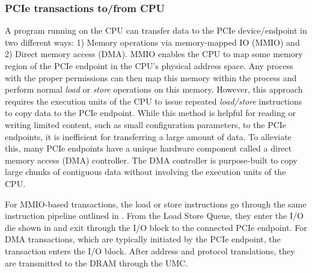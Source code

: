 \subsubsection{PCIe transactions to/from CPU}
\label{subsubsec:interconnect-sc-background-cpu-arch-pcie-transactions}

A program running on the CPU can transfer data to the PCIe device/endpoint in two different ways: 1) Memory operations via memory-mapped IO (MMIO) and 2) Direct memory access (DMA).
MMIO enables the CPU to map some memory region of the PCIe endpoint in the CPU's physical address space.
Any process with the proper permissions can then map this memory within the process and perform normal \textit{load} or \textit{store} operations on this memory.
However, this approach requires the execution units of the CPU to issue repeated \textit{load/store} instructions to copy data to the PCIe endpoint.
While this method is helpful for reading or writing limited content, such as small configuration parameters, to the PCIe endpoints, it is inefficient for transferring a large amount of data.
To alleviate this, many PCIe endpoints have a unique hardware component called a direct memory access (DMA) controller.
The DMA controller is purpose-built to copy large chunks of contiguous data without involving the execution units of the CPU.

For MMIO-based transactions, the load or store instructions go through the same instruction pipeline outlined in . 
From the Load Store Queue, they enter the I/O die shown in  and exit through the I/O block to the connected PCIe endpoint.
For DMA transactions, which are typically initiated by the PCIe endpoint, the transaction enters the I/O block. 
After address and protocol translations, they are transmitted to the DRAM through the UMC.